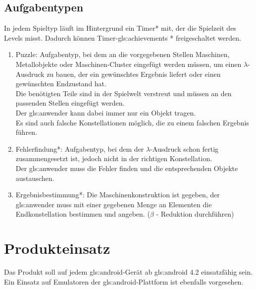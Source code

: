 \documentclass{scrartcl}
\begin{document}
\clearpage


\subsection{Aufgabentypen} \label{subsection:Aufgabentypen}

In jedem Spieltyp läuft im Hintergrund ein Timer* mit, der die Spielzeit des Levels misst. Dadurch können Timer-\glspl{gls:achievement} * freigeschaltet werden.
\begin{enumerate}
	\item \label{aufgabentyp:puzzle} Puzzle: Aufgabentyp, bei dem an die vorgegebenen Stellen Maschinen, Metallobjekte oder Maschinen-Cluster eingefügt werden müssen, um einen $\lambda$-Ausdruck zu bauen, der ein gewünschtes Ergebnis liefert oder einen gewünschten Endzustand hat.\\
	Die benötigten Teile sind in der Spielwelt verstreut und müssen an den passenden Stellen eingefügt werden.\\
	Der \gls{gls:anwender} kann dabei immer nur ein Objekt tragen.\\
	Es sind auch falsche Konstellationen möglich, die zu einem falschen Ergebnis führen.\\
	\item \label{aufgabentyp:fehlerfindung} Fehlerfindung*: Aufgabentyp, bei dem der $\lambda$-Ausdruck schon fertig zusammengesetzt ist, jedoch nicht in der richtigen Konstellation.\\
	Der \gls{gls:anwender} muss die Fehler finden und die entsprechenden Objekte austauschen.\\
	\item \label{aufgabentyp:ergebnis} Ergebnisbestimmung*: Die Maschinenkonstruktion ist gegeben, der \gls{gls:anwender} muss mit einer gegebenen Menge an Elementen die Endkonstellation bestimmen und angeben. ($\beta$ - Reduktion durchführen) 
\end{enumerate}

\clearpage









\section{Produkteinsatz}

Das Produkt soll auf jedem \gls{gls:android}-Gerät ab \gls{gls:android} 4.2 einsatzfähig sein. Ein Einsatz auf Emulatoren der \gls{gls:android}-Plattform ist ebenfalls vorgesehen.
\end{document}
